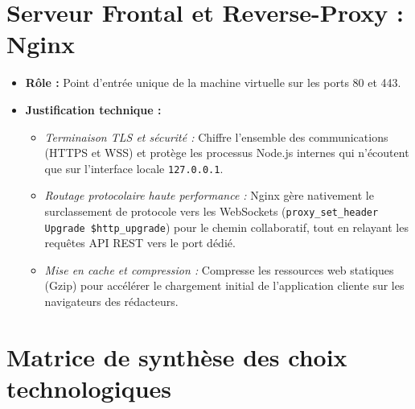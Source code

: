 \section{Serveur Frontal et Reverse-Proxy : Nginx}
\begin{itemize}
    \item \textbf{Rôle :} Point d'entrée unique de la machine virtuelle sur les ports 80 et 443.
    \item \textbf{Justification technique :} 
    \begin{itemize}
        \item \emph{Terminaison TLS et sécurité :} Chiffre l'ensemble des communications (HTTPS et WSS) et protège les processus Node.js internes qui n'écoutent que sur l'interface locale \texttt{127.0.0.1}.
        \item \emph{Routage protocolaire haute performance :} Nginx gère nativement le surclassement de protocole vers les WebSockets (\texttt{proxy\_set\_header Upgrade \$http\_upgrade}) pour le chemin collaboratif, tout en relayant les requêtes API REST vers le port dédié.
        \item \emph{Mise en cache et compression :} Compresse les ressources web statiques (Gzip) pour accélérer le chargement initial de l'application cliente sur les navigateurs des rédacteurs.
    \end{itemize}
\end{itemize}

\section{Matrice de synthèse des choix technologiques}

